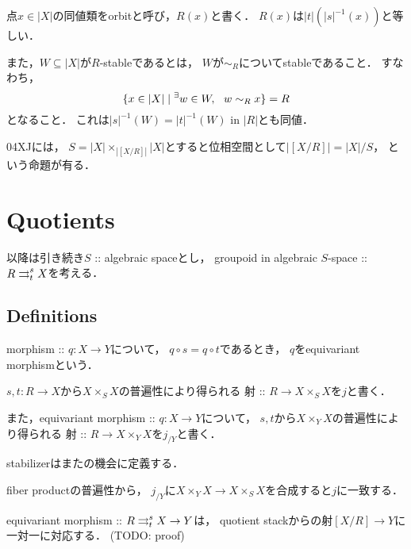 \begin{Def}
    点$x \in |X|$の同値類をorbitと呼び，$R(x)$と書く．
    $R(x)$は$|t|(|s|^{-1}(x))$と等しい．

    また，$W \subseteq |X|$が$R$-stableであるとは，
    $W$が$\sim_{R}$についてstableであること．
    すなわち，
    \[ \{ x \in |X| \mid {}^{\exists} w \in W,~~ w \sim_R x \}=R \]
    となること．
    これは$|s|^{-1}(W)=|t|^{-1}(W)$ in $|R|$とも同値．
\end{Def}

\begin{Remark}
    \cite{SP} 04XJには，
    $S=|X| \times_{|[X/R]|} |X|$とすると位相空間として$|[X/R]|=|X|/S$，
    という命題が有る．
\end{Remark}

\section{Quotients}

以降は引き続き$S$ :: algebraic spaceとし，
groupoid in algebraic $S$-space :: $R \mathrel{\mathop{\rightrightarrows}^{s}_{t}} X$を考える．

\subsection{Definitions}
\begin{Def}
    morphism :: $q \colon X \to Y$について，
    $q \circ s=q \circ t$であるとき，
    $q$をequivariant morphismという．
\end{Def}

\begin{Def}[$j, j_{Y}$]
    $s,t \colon R \to X$から$X \times_{S} X$の普遍性により得られる
    射 :: $R \to X \times_{S} X$を$j$と書く．

    また，equivariant morphism :: $q \colon X \to Y$について，
    $s,t$から$X \times_{Y} X$の普遍性により得られる
    射 :: $R \to X \times_{Y} X$を$j_{/Y}$と書く．
\end{Def}

stabilizerはまたの機会に定義する．

\begin{Remark}
    fiber productの普遍性から，
    $j_{/Y}$に$X \times_{Y} X \to X \times_{S} X$を合成すると$j$に一致する．
\end{Remark}

\begin{Remark}
    equivariant morphism :: $R \mathrel{\mathop{\rightrightarrows}^{s}_{t}} X \to Y$は，
    quotient stackからの射$[X/R] \to Y$に一対一に対応する．
    (TODO: proof)
\end{Remark}

